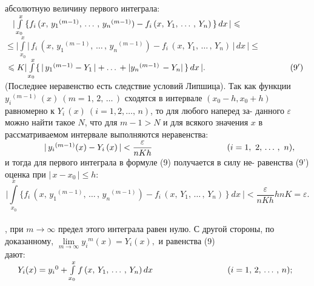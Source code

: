 \documentclass[10pt, a5paper]{book}
\begin{document}
 абсолютную величину первого интеграла: \\

$\hspace{0.3cm}\vert\int\limits_{x_0}^{x} \,\{f_i\,(x, \, y_1{}^{(m-1)}, \, \dots \, , \, y_n{}^{(m-1)})-f_i\,(x, \, Y_1, \, \dots \, , \, Y_n)\,\}\, dx \, \vert \leqslant $ \\

$\leqslant \vert\int\limits_{x_0}^{x}\vert \, f_i\,(x,\, y_1{}^{(m-1)},\,  \dots \, , \, y_n{}^{(m-1)})-f_i\,(x,\, Y_1, \, \dots \, , \, Y_n) \,\vert \, dx \, \vert \leqslant $ \\

\noindent $\hspace{0.1cm}\leqslant K\vert\int\limits_{x_0}^{x}\{ \,\vert \, y_1{}^{(m-1)}-Y_1\,\vert+  \dots \, +\vert y_n{}^{(m-1)\,}-Y_n\vert\,\}\, dx\, \vert.\qquad\qquad\qquad\qquad\qquad(9')$ \linebreak
(Последнее неравенство есть следствие условий Липшица). Так как\linebreak
функции $y_i{}^{(m-1)}\,(x) \ (m=1,\, 2, \, \dots \, )$ сходятся в интервале $(x_0-h, x_0+h)$\linebreak
равномерно к $Y_i\,(x) \ (i=1, 2,  \dots ,\, n)$, то для любого наперед за-\linebreak
данного $\varepsilon$ можно найти такое $N$, что для $m-1>N$ и для всякого\linebreak
значения $x$ в рассматриваемом интервале выполняются неравенства: \\

$\hspace{1.6cm}\vert \, y_i{}^{(m-1)}(x)-Y_i\,(x)\,\vert <\dfrac{\varepsilon}{nKh} \hspace{3.1cm} (i=1, \ 2, \, \dots \, , \ n),$ \\

и тогда для первого интеграла в формуле (9) получается в силу не-\linebreak
равенства (9') оценка при $\vert \, x-x_0 \,\vert \leqslant h:$
$$\vert\int\limits_{x_0}^{x}\{f_i\,(x,\, y_1{}^{(m-1)} ,\, \dots \, , \, y_n{}^{(m-1)})-f_i\,(x,\, Y_1, \, \dots \, , \, Y_n)\,\} \ dx \ \vert <\frac{\varepsilon}{nKh}hnK=\varepsilon.$$ \\
, при $m\to\infty$ предел этого интеграла равен нулю.\linebreak
С другой стороны, по доказанному, $\lim\limits_{m\to\infty} y_i{}^{m}(x)=Y_i(x),$ и равенства (9) \\

\noindent дают: \\

$\hspace{0.5cm}Y_i(x)=y_i{}^{0}+\int\limits_{x_0}^xf\,(x, \, Y_1, \, \dots \, , \, Y_n)\,dx \hspace{3.1cm} (i=1,\,2,\, \dots \, , \, n);$
\end{document}

